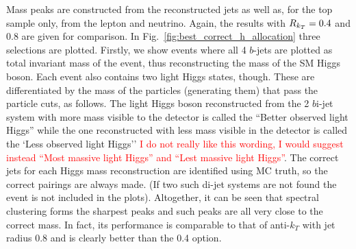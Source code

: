 %


Mass peaks are constructed from the reconstructed jets as well as, for the top sample only, from the lepton and neutrino.
Again, the \antikt{} results  with \(R{}_{k_T} = 0.4\) and \(0.8\) are given for comparison.
In Fig.~\ref{fig:best_correct_h_allocation} three selections are plotted. Firstly, we show events where all 4 $b$-jets  
are plotted as total invariant mass of the event, thus reconstructing the mass of the SM Higgs boson.
Each event also contains two light Higgs states, though. These are differentiated by the mass of the particles (generating them) that pass the particle cuts,
as follows. The light Higgs boson reconstructed from the 2 $b$i-jet system with more mass visible to the detector is called the ``Better observed light Higgs''
while the one reconstructed  with less mass visible in the detector is called the `Less observed light Higgs'' {\textcolor{red}{I do not really like this wording, I would suggest instead ``Most massive light Higgs'' and ``Lest massive light Higgs''}}.
The correct jets for each Higgs mass reconstruction are identified using MC truth,
so the correct pairings are always made. (If two such di-jet systems are not found the event is not included in the plots).
Altogether, it can be seen that spectral clustering forms the sharpest peaks and such peaks are all very close to the correct mass. In fact, its performance
is comparable to that of anti-$k_T$ with jet radius 0.8 and is clearly better than the 0.4 option. 


